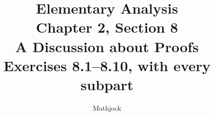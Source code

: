 
\title{\textbf{Elementary Analysis}\\[0.3em]
Chapter 2, Section 8\\[0.3em]
\large A Discussion about Proofs\\
Exercises 8.1--8.10, with every subpart}
\author{Mathjock}
\date{}

\maketitle
\bookinfo
\tableofcontents
\clearpage
\setcounter{section}{7}


